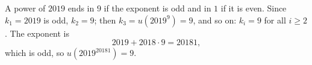 A power of $2019$ ends in $9$ if the exponent is odd and in $1$ if it is even. Since $k_1=2019$ is odd, $k_2=9$; then $k_3=u(2019^9)=9$, and so on: $k_i=9$ for all $i\ge2$. The exponent is
\[
2019+2018\cdot9=20181,
\]
which is odd, so $u\left(2019^{20181}\right)=\boxed{9}$.
